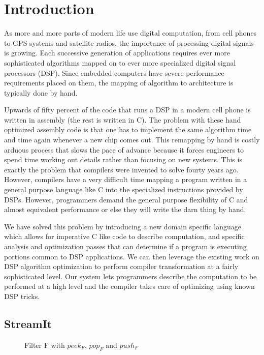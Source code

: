 \section{Introduction}
As more and more parts of modern life use digital computation, from cell phones to GPS systems
and satellite radios, the importance of processing digital signals is growing.
Each successive generation of applications requires ever more sophisticated algorithms mapped 
on to ever more specialized digital signal processors (DSP). Since embedded computers have severe performance
requirements placed on them, the mapping of algorithm to architecture is typically done by hand.

Upwards of fifty percent of the code that runs a DSP in a modern cell phone is written in assembly
(the rest is written in C). The problem with these hand optimized assembly code is that one 
has to implement the same algorithm time and time again whenever a new chip comes out. 
This remapping by hand is costly arduous process that 
slows the pace of advance because it forces engineers to spend time working out details rather 
than focusing on new systems. This is exactly the problem that compilers were invented to solve
fourty years ago. However, compilers have a very difficult time mapping a program written in 
a general purpose language like C into the specialized instructions provided by DSPs. However,
programmers demand the general purpose flexibility of C and almost equivalent performance
or else they will write the darn thing by hand. 

We have solved this problem by introducing a new domain specific language which
allows for imperative C like code to describe computation, and 
specific analysis and optimization passes that can determine if a program is
executing portions common to DSP applications. We can then leverage
the existing work on DSP algorithm optimization to perform compiler transformation
at a fairly sophisticated level. Our system lets programmers describe the
computation to be performed at a high level and the compiler takes care of optimizing
using known DSP tricks.

\subsection{StreamIt}

\begin{figure}
\center
\epsfxsize=3.0in
\caption{Filter F with $peek_{F}$, $pop_{F}$ and $push_{F}$}
\label{fig:overview-filter}
\end{figure}


